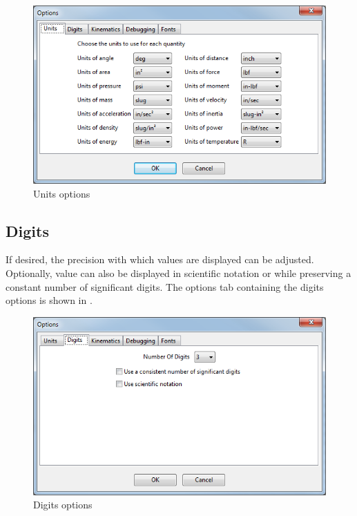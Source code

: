 \begin{figure}
  \includegraphics[width=\textwidth]{images/optionsUnits}
  \caption{Units options} \label{fig:optionsUnits}
  \centering
\end{figure}

\subsection{Digits} \label{ssec:optionsDigits}

If desired, the precision with which values are displayed can be adjusted.  Optionally, value can also be displayed in scientific notation or while preserving a constant number of significant digits.  The options tab containing the digits options is shown in .

\begin{figure}
  \includegraphics[width=\textwidth]{images/optionsDigits}
  \caption{Digits options} \label{fig:optionsDigits}
  \centering
\end{figure}

